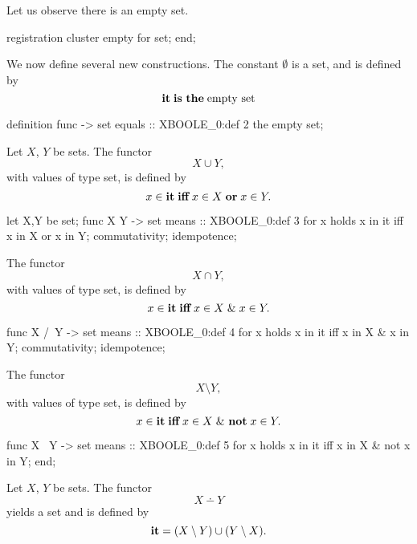 \begin{paracol}{2}
\noindent Let us observe there is an empty set.

\switchcolumn

\begin{mizar}
registration
  cluster empty for set;
end;
\end{mizar}

\switchcolumn*\ensurevspace{5cm}

We now define several new constructions. The constant $\emptyset$ is a set, and is
defined by
\[\mathop{\textbf{it}} \mathrel{\textbf{is}}\ \mathrel{\textbf{the}} \mathrm{empty}\ \mathrm{set} \]

\switchcolumn

\begin{mizar}
definition
  func {} -> set
  equals :: XBOOLE_0:def 2
  the empty set;
\end{mizar}

\switchcolumn*\ensurevspace{5cm}\noindent%
Let $X$, $Y$ be sets. The functor
\[ X\cup Y,\]
with values of type set, is defined by
\[ x\in\mathop{\textbf{it}} \mathrel{\textbf{iff}} x\in X\mathrel{\textbf{or}} x\in Y. \]

\switchcolumn

\begin{mizar}
  let X,Y be set;
  func X \/ Y -> set
  means :: XBOOLE_0:def 3
  for x holds x in it
  iff x in X or x in Y;
  commutativity;
  idempotence;
\end{mizar}

\switchcolumn*\ensurevspace{5cm}\sloppy\noindent%
The functor
\[ X\cap Y,\]
with values of type set, is defined by
\[ x\in\mathop{\textbf{it}} \mathrel{\textbf{iff}} x\in X\mathrel{\&} x\in Y. \]

\switchcolumn

\begin{mizar}
  func X /\ Y -> set
  means :: XBOOLE_0:def 4
  for x holds x in it
  iff x in X & x in Y;
  commutativity;
  idempotence;
\end{mizar}

\switchcolumn*\ensurevspace{5cm}\noindent%
The functor
\[ X\setminus Y,\]
with values of type set, is defined by
\[ x\in\mathop{\textbf{it}} \mathrel{\textbf{iff}} x\in X\mathrel{\&}\ \mathrel{\textbf{not}} x\in Y. \]

\switchcolumn

\begin{mizar}
  func X \ Y -> set
  means :: XBOOLE_0:def 5
  for x holds x in it
  iff x in X & not x in Y;
end;
\end{mizar}

\switchcolumn*\ensurevspace{5cm}
Let $X$, $Y$ be sets. The functor
\[ X\dotminus Y\]
yields a set and is defined by
\[ \mathop{\textbf{it}} = (X \setminus Y)\cup(Y \setminus X).\]


\end{paracol}
